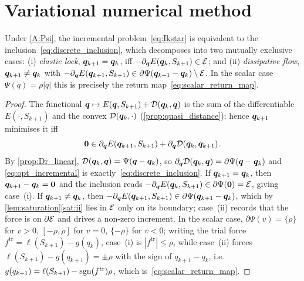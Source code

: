 \section{Variational numerical method}
\label{app:numerical}

\begin{proposition}\label{prop:return_map}
Under \ref{A:Psi}, the incremental problem~\eqref{eq:Ikstar} is
equivalent to the inclusion~\eqref{eq:discrete_inclusion}, which
decomposes into two mutually exclusive cases:
\textnormal{(i)} \emph{elastic lock}, $\bm{q}_{k+1}=\bm{q}_k$, iff
$-\partial_{\bm{q}}E(\bm{q}_k,S_{k+1})\in\mathcal{E}$; and
\textnormal{(ii)} \emph{dissipative flow}, $\bm{q}_{k+1}\ne\bm{q}_k$ with
$-\partial_{\bm{q}}E(\bm{q}_{k+1},S_{k+1})\in\partial\Psi(\bm{q}_{k+1}-\bm{q}_k)\setminus\mathcal{E}$.
In the scalar case $\Psi(\dot q)=\rho|\dot q|$ this is precisely the
return map~\eqref{eq:scalar_return_map}.
\end{proposition}

\begin{proof}
The functional $\bm{q}\mapsto E(\bm{q},S_{k+1})+\mathcal{D}(\bm{q}_k,\bm{q})$ is the
sum of the differentiable $E(\cdot,S_{k+1})$ and the convex
$\mathcal{D}(\bm{q}_k,\cdot)$ (\cref{prop:quasi_distance}); hence $\bm{q}_{k+1}$
minimises it iff
\begin{equation}\label{eq:opt_incremental}
  \bm{0}\in\partial_{\bm{q}}E(\bm{q}_{k+1},S_{k+1})+\partial_{\bm{q}}\mathcal{D}(\bm{q}_k,\bm{q}_{k+1}).
\end{equation}
By \cref{prop:Dr_linear}, $\mathcal{D}(\bm{q}_k,\bm{q})=\Psi(\bm{q}-\bm{q}_k)$, so
$\partial_{\bm{q}}\mathcal{D}(\bm{q}_k,\bm{q})=\partial\Psi(\bm{q}-\bm{q}_k)$ and
\eqref{eq:opt_incremental} is exactly~\eqref{eq:discrete_inclusion}. If
$\bm{q}_{k+1}=\bm{q}_k$, then $\bm{q}_{k+1}-\bm{q}_k=\bm{0}$ and the inclusion
reads $-\partial_{\bm{q}}E(\bm{q}_k,S_{k+1})\in\partial\Psi(\bm{0})=\mathcal{E}$,
giving case~(i). If $\bm{q}_{k+1}\ne\bm{q}_k$, then
$-\partial_{\bm{q}}E(\bm{q}_{k+1},S_{k+1})\in\partial\Psi(\bm{q}_{k+1}-\bm{q}_k)$,
which by \cref{lem:saturation}\ref{sat:ii} lies in $\mathcal{E}$ only on its
boundary; case~(ii) records that the force is on $\partial\mathcal{E}$ and drives
a non-zero increment. In the scalar case, $\partial\Psi(v)=\{\rho\}$ for
$v>0$, $[-\rho,\rho]$ for $v=0$, $\{-\rho\}$ for $v<0$; writing the
trial force $f^{\mathrm{tr}}=\ell(S_{k+1})-g(q_k)$, case~(i) is
$|f^{\mathrm{tr}}|\le\rho$, while case~(ii) forces
$\ell(S_{k+1})-g(q_{k+1})=\pm\rho$ with the sign of $q_{k+1}-q_k$, i.e.\
$g(q_{k+1})=\ell(S_{k+1})-\operatorname{sgn}(f^{\mathrm{tr}})\rho$, which
is~\eqref{eq:scalar_return_map}.
\end{proof}

